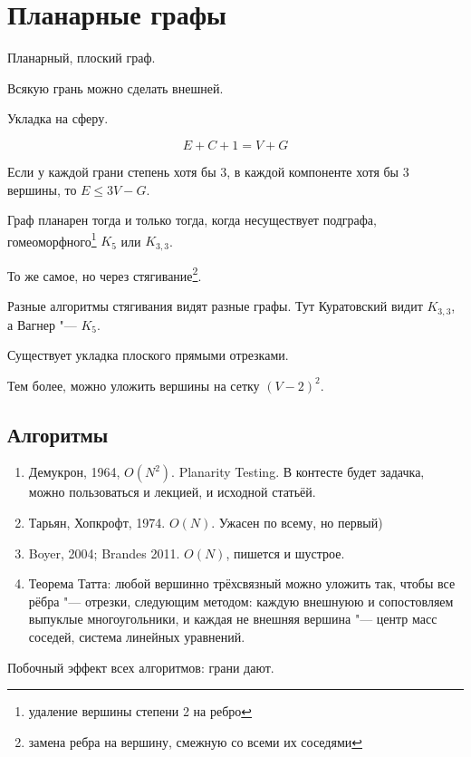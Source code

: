 \chapter{Планарные графы}

\begin{Def}
	Планарный, плоский граф.
\end{Def}

\begin{theorem}
	Всякую грань можно сделать внешней.
\end{theorem}
Укладка на сферу.

\begin{theorem}[Эйлера]
	\[ E + C + 1 = V + G \]
\end{theorem}
\begin{conseq}
	Если у каждой грани степень хотя бы 3, в каждой компоненте хотя бы 3 вершины, то $E \leq 3V - G$.
\end{conseq}

\begin{theorem}[Куратовский, 1930]
	Граф планарен тогда и только тогда, когда несуществует подграфа, гомеоморфного\footnote{удаление вершины степени 2 на ребро}
	$K_5$ или $K_{3,3}$.
\end{theorem}
\begin{theorem}[Вагнер, 1937]
	То же самое, но через стягивание\footnote{замена ребра на вершину, смежную со всеми их соседями}.
\end{theorem}

Разные алгоритмы стягивания видят разные графы.
Тут Куратовский видит $K_{3,3}$, а Вагнер "--- $K_5$.

\begin{theorem}[Форш, 1948]
	Существует укладка плоского прямыми отрезками.
\end{theorem}
\begin{theorem}[Шнаудер, 1989]
	Тем более, можно уложить вершины на сетку $(V - 2)^2$.
\end{theorem}

\section{Алгоритмы}

\begin{enumerate}
	\item Демукрон, 1964, $O(N^2)$. Planarity Testing.
		В контесте будет задачка, можно пользоваться и лекцией, и исходной статьёй.
	\item Тарьян, Хопкрофт, 1974. $O(N)$. Ужасен по всему, но первый)
	\item Boyer, 2004; Brandes 2011. $O(N)$, пишется и шустрое.
	\item Теорема Татта: любой вершинно трёхсвязный можно уложить так, чтобы все рёбра "--- отрезки, следующим методом:
		каждую внешнуюю и сопостовляем выпуклые многоугольники, и каждая не внешняя вершина "--- центр масс соседей, система линейных уравнений.
\end{enumerate}
Побочный эффект всех алгоритмов: грани дают.


